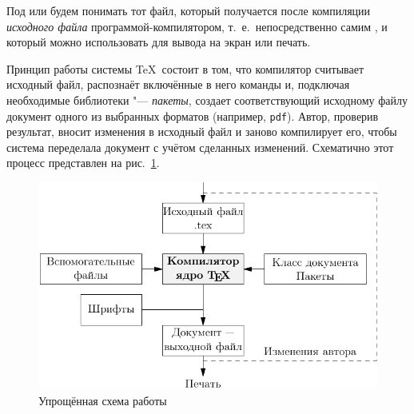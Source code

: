 Под  или  будем понимать тот файл, который получается после компиляции \emph{исходного файла} про\-грам\-мой-ком\-пи\-ля\-то\-ром, т.~е.\ непосредственно самим , и который можно использовать для вывода на экран или печать.

Принцип работы системы \TeX\ состоит в том, что компилятор считывает исходный файл, распознаёт включённые в него команды и, подключая необходимые библиотеки "--- \emph{пакеты}, создает соответствующий исходному файлу документ одного из выбранных форматов (например, \texttt{pdf}). Автор, проверив результат, вносит изменения в исходный файл и заново компилирует его, чтобы система переделала документ с учётом сделанных изменений. Схематично этот процесс представлен на рис.~\ref{Fig:MainFile-1}.





\begin{figure}[htb]
\centering
\includegraphics[scale=0.8]{CH-MainFile/Fig-MainFile-1}
\caption{Упрощённая схема работы}
\label{Fig:MainFile-1}
\end{figure}


